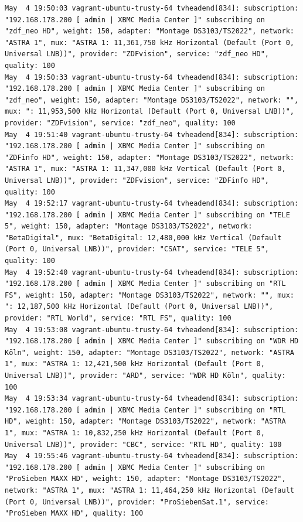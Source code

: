 \begin{cmd}[H]
\begin{Verbatim}[fontsize=\tiny]
May  4 19:50:03 vagrant-ubuntu-trusty-64 tvheadend[834]: subscription: "192.168.178.200 [ admin | XBMC Media Center ]" subscribing on "zdf_neo HD", weight: 150, adapter: "Montage DS3103/TS2022", network: "ASTRA 1", mux: "ASTRA 1: 11,361,750 kHz Horizontal (Default (Port 0, Universal LNB))", provider: "ZDFvision", service: "zdf_neo HD", quality: 100
May  4 19:50:33 vagrant-ubuntu-trusty-64 tvheadend[834]: subscription: "192.168.178.200 [ admin | XBMC Media Center ]" subscribing on "zdf_neo", weight: 150, adapter: "Montage DS3103/TS2022", network: "", mux: ": 11,953,500 kHz Horizontal (Default (Port 0, Universal LNB))", provider: "ZDFvision", service: "zdf_neo", quality: 100
May  4 19:51:40 vagrant-ubuntu-trusty-64 tvheadend[834]: subscription: "192.168.178.200 [ admin | XBMC Media Center ]" subscribing on "ZDFinfo HD", weight: 150, adapter: "Montage DS3103/TS2022", network: "ASTRA 1", mux: "ASTRA 1: 11,347,000 kHz Vertical (Default (Port 0, Universal LNB))", provider: "ZDFvision", service: "ZDFinfo HD", quality: 100
May  4 19:52:17 vagrant-ubuntu-trusty-64 tvheadend[834]: subscription: "192.168.178.200 [ admin | XBMC Media Center ]" subscribing on "TELE 5", weight: 150, adapter: "Montage DS3103/TS2022", network: "BetaDigital", mux: "BetaDigital: 12,480,000 kHz Vertical (Default (Port 0, Universal LNB))", provider: "CSAT", service: "TELE 5", quality: 100
May  4 19:52:40 vagrant-ubuntu-trusty-64 tvheadend[834]: subscription: "192.168.178.200 [ admin | XBMC Media Center ]" subscribing on "RTL FS", weight: 150, adapter: "Montage DS3103/TS2022", network: "", mux: ": 12,187,500 kHz Horizontal (Default (Port 0, Universal LNB))", provider: "RTL World", service: "RTL FS", quality: 100
May  4 19:53:08 vagrant-ubuntu-trusty-64 tvheadend[834]: subscription: "192.168.178.200 [ admin | XBMC Media Center ]" subscribing on "WDR HD Köln", weight: 150, adapter: "Montage DS3103/TS2022", network: "ASTRA 1", mux: "ASTRA 1: 12,421,500 kHz Horizontal (Default (Port 0, Universal LNB))", provider: "ARD", service: "WDR HD Köln", quality: 100
May  4 19:53:34 vagrant-ubuntu-trusty-64 tvheadend[834]: subscription: "192.168.178.200 [ admin | XBMC Media Center ]" subscribing on "RTL HD", weight: 150, adapter: "Montage DS3103/TS2022", network: "ASTRA 1", mux: "ASTRA 1: 10,832,250 kHz Horizontal (Default (Port 0, Universal LNB))", provider: "CBC", service: "RTL HD", quality: 100
May  4 19:55:46 vagrant-ubuntu-trusty-64 tvheadend[834]: subscription: "192.168.178.200 [ admin | XBMC Media Center ]" subscribing on "ProSieben MAXX HD", weight: 150, adapter: "Montage DS3103/TS2022", network: "ASTRA 1", mux: "ASTRA 1: 11,464,250 kHz Horizontal (Default (Port 0, Universal LNB))", provider: "ProSiebenSat.1", service: "ProSieben MAXX HD", quality: 100

\end{Verbatim}
\end{cmd}
